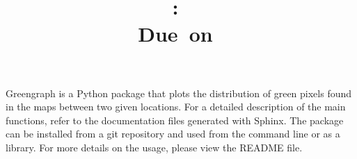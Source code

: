 \documentclass{article}
\title{
\vspace{2in}
\textmd{\textbf{\hmwkClass:\ \hmwkTitle}}\\
\normalsize\vspace{0.1in}\small{Due\ on\ \hmwkDueDate}\\
\vspace{3in}
}
\author{\textbf{\hmwkAuthorName}}
\date{} %
\begin{document}
\maketitle



\newpage

Greengraph is a Python package that plots the distribution of green pixels found in the maps between two given locations. For a detailed description of the main functions, refer to the documentation files generated with Sphinx. The package can be installed from a git repository and used from the command line or as a library. For more details on the usage, please view the README file. \\


\end{document}
